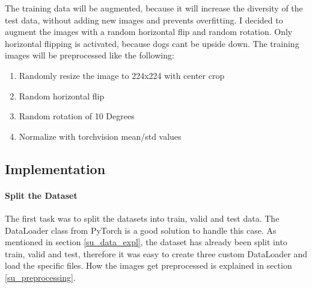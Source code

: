 \documentclass{article}
\begin{document}
The training data will be augmented, because it will increase the diversity of the test data, without adding new images and prevents overfitting. I decided to augment the images with a random horizontal flip and random rotation. Only horizontal flipping is activated, because dogs cant be upside down. The training images will be preprocessed like the following:
\begin{enumerate}
	\item Randomly resize the image to 224x224 with center crop
	\item Random horizontal flip
	\item Random rotation of 10 Degrees
	\item Normalize with torchvision mean/std values
\end{enumerate}

\subsection{Implementation} \label{su_implementation}
\paragraph{Split the Dataset} The first task  was to split the datasets into train, valid and test data. The DataLoader class from PyTorch is a good solution to handle this case. As mentioned in section \ref{su_data_expl}, the dataset has already been split into train, valid and test, therefore it was easy to create three custom DataLoader and load the specific files. How the images get preprocessed is explained in section \ref{su_preprocessing}.\newline
\end{document}
